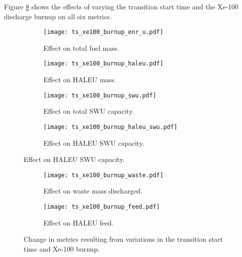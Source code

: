 Figure \ref{fig:ts_xe100_bu} shows the effects of varying the 
transition start time and the Xe-100 discharge burnup on all six 
metrics. 
\begin{figure}
    \begin{subfigure}[t]{0.48\textwidth}
        \centering
        \texttt{[image: ts\_xe100\_burnup\_enr\_u.pdf]}
        \caption{Effect on total fuel mass.}
        \label{fig:ts_xe100_bu_enr_u}
    \end{subfigure}
    \hfill
    \begin{subfigure}[t]{0.48\textwidth}
        \centering
        \texttt{[image: ts\_xe100\_burnup\_haleu.pdf]}
        \caption{Effect on HALEU mass.}
        \label{fig:ts_xe100_bu_haleu}
    \end{subfigure}
    
    \begin{subfigure}[t]{0.48\textwidth}
        \centering
        \texttt{[image: ts\_xe100\_burnup\_swu.pdf]}
        \caption{Effect on total SWU capacity.}
        \label{fig:ts_xe100_bu_swu}
    \end{subfigure}
    \hfill
    \begin{subfigure}[t]{0.48\textwidth}
        \centering
        \texttt{[image: ts\_xe100\_burnup\_haleu\_swu.pdf]}
        \caption{Effect on HALEU SWU capacity.}
        \label{fig:ts_xe100_bu_haleu_swu}
    \end{subfigure}
\end{figure}

\begin{figure}
    \ContinuedFloat    
    \begin{subfigure}[t]{0.48\textwidth}
        \centering
        \texttt{[image: ts\_xe100\_burnup\_waste.pdf]}
        \caption{Effect on waste mass discharged.}
        \label{fig:ts_xe100_bu_waste}
    \end{subfigure}
    \hfill
    \begin{subfigure}[t]{0.48\textwidth}
        \centering
        \texttt{[image: ts\_xe100\_burnup\_feed.pdf]}
        \caption{Effect on HALEU feed.}
        \label{fig:ts_xe100_bu_feed}
    \end{subfigure}
    \caption{Change in metrics resulting from variations in the 
    transition start time and Xe-100 burnup.}
    \label{fig:ts_xe100_bu}
\end{figure}

